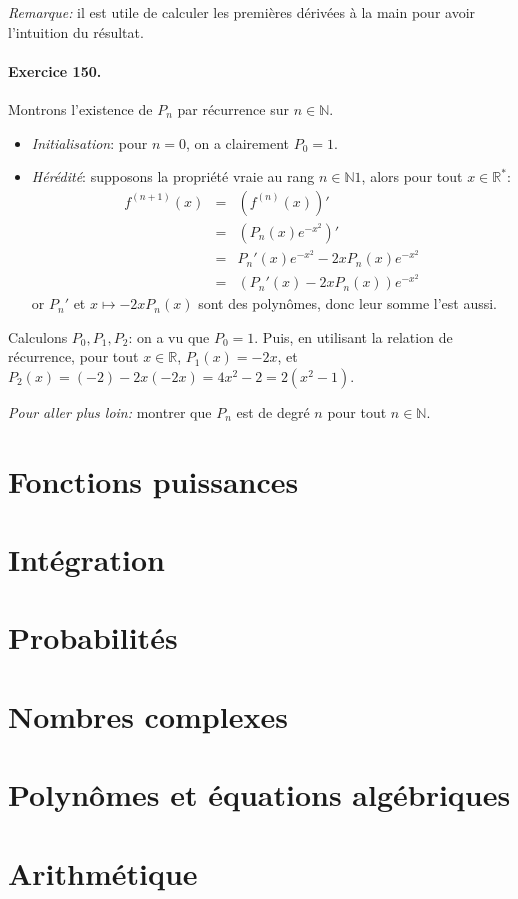 \documentclass[a4paper,11pt]{article}
\begin{document}
\textit{Remarque:} il est utile de calculer les premières dérivées à la main pour avoir l'intuition du résultat.

\paragraph{Exercice 150.} Montrons l'existence de $P_n$ par récurrence sur $n\in\mathbb{N}$.
\begin{itemize}
  \item \textit{Initialisation}: pour $n=0$, on a clairement $P_0=1$.
  \item \textit{Hérédité}: supposons la propriété vraie au rang $n\in \mathbb{N}1$, alors pour tout $x \in \mathbb{R}^*$:
  \begin{eqnarray}
    f^{(n+1)}(x) &=& \left( f^{(n)}(x) \right)'  \nonumber \\
                &=& \left( P_n(x)e^{-x^2} \right)'  \nonumber \\
                &=& P_n'(x)e^{-x^2}-2xP_n(x)e^{-x^2}  \nonumber \\
                &=& \left( P_n'(x) - 2xP_n(x) \right)e^{-x^2} \nonumber 
  \end{eqnarray}
  or $P_n'$ et $x\mapsto-2xP_n(x)$ sont des polynômes, donc leur somme l'est aussi.
\end{itemize}
Calculons $P_0,P_1,P_2$: on a vu que $P_0=1$. Puis, en utilisant la relation de récurrence, pour tout $x\in\mathbb{R}$, $P_1(x)=-2x$, et $P_2(x)=(-2)-2x(-2x)=4x^2-2=2(x^2-1)$.

\textit{Pour aller plus loin:} montrer que $P_n$ est de degré $n$ pour tout $n\in\mathbb{N}$.

\section{Fonctions puissances}
\section{Intégration}
\section{Probabilités}
\section{Nombres complexes}
\section{Polynômes et équations algébriques}
\section{Arithmétique}
\end{document}
